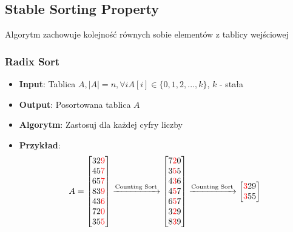 \documentclass[11pt,a4paper]{article}
\begin{document}
\subsection{Stable Sorting Property}
Algorytm zachowuje kolejność równych sobie elementów z tablicy wejściowej

\subsubsection{Radix Sort}
\begin{itemize}
    \item \textbf{Input}: Tablica $A, |A|=n, \forall i A[i] \in \{0,1,2,...,k\}$, $k$ - stała
    \item \textbf{Output}: Posortowana tablica $A$
    \item \textbf{Algorytm}: Zastosuj  dla każdej cyfry liczby
    \item \textbf{Przykład}:
        \[
            A = \begin{bmatrix}
                32\textcolor{red}{9} \\
                45\textcolor{red}{7} \\
                65\textcolor{red}{7} \\
                83\textcolor{red}{9} \\
                43\textcolor{red}{6} \\
                72\textcolor{red}{0} \\
                35\textcolor{red}{5}
                \end{bmatrix} \xrightarrow{\text{Counting Sort}} \begin{bmatrix}
                7\textcolor{red}{2}0 \\
                3\textcolor{red}{5}5 \\
                4\textcolor{red}{3}6 \\
                4\textcolor{red}{5}7 \\
                6\textcolor{red}{5}7 \\
                3\textcolor{red}{2}9 \\
                8\textcolor{red}{3}9
                \end{bmatrix} \xrightarrow{\text{Counting Sort}} \begin{bmatrix}
                \textcolor{red}{3}29 \\
                \textcolor{red}{3}55 \\

\end{bmatrix}\]
\end{itemize}
\end{document}
